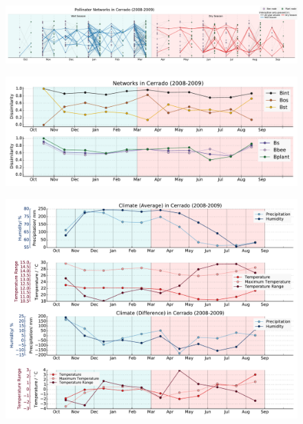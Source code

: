 \documentclass[11pt]{article}
\begin{document}
\begin{landscape}
\begin{figure}[H]
  \centering
    \includegraphics[width=255mm]{seasonalnetwork(new).pdf}
\end{figure}

\begin{figure}[H]
  \centering
    \includegraphics[width=250mm]{TurnoversAcrossTime(new).pdf}
\end{figure}

\begin{figure}[H]
  \centering
    \includegraphics[width=250mm]{ClimateAcrossTime(new).pdf}
    \label{fig:climate2}
\end{figure}
\end{landscape}

\newpage


\end{document}
